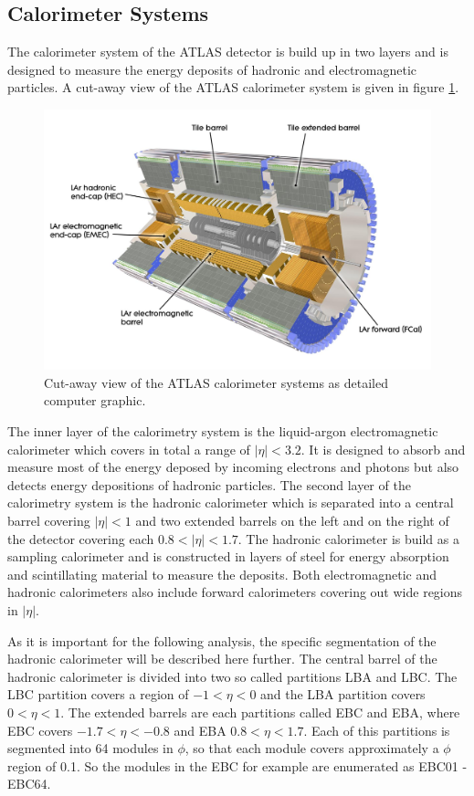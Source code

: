 \subsection{Calorimeter Systems}
The calorimeter system of the ATLAS detector is build up in two layers and is designed to measure the energy deposits of hadronic and electromagnetic particles.
A cut-away view of the ATLAS calorimeter system is given in figure \ref{Calo}.
\begin{figure}[H]
	\centering
	\includegraphics[width=\textwidth]{./Plots/atlas-calo-high.jpg}
	\caption{Cut-away view of the ATLAS calorimeter systems as detailed computer graphic.\cite{Aad:2008zzm}}
	\label{Calo}
\end{figure}
The inner layer of the calorimetry system is the liquid-argon electromagnetic calorimeter which covers in total a range of $|\eta| < 3.2$.
It is designed to absorb and measure most of the energy deposed by incoming electrons and photons but also detects energy depositions of hadronic particles.
The second layer of the calorimetry system is the hadronic calorimeter which is separated into a central barrel covering $|\eta| < 1$ and two extended barrels on the left and on the right of the detector covering each $0.8 < |\eta| < 1.7$.
The hadronic calorimeter is build as a sampling calorimeter and is constructed in layers of steel for energy absorption and scintillating material to measure the deposits.
Both electromagnetic and hadronic calorimeters also include forward calorimeters covering out wide regions in $|\eta|$.

As it is important for the following analysis, the specific segmentation of the hadronic calorimeter will be described here further.
The central barrel of the hadronic calorimeter is divided into two so called partitions LBA and LBC.
The LBC partition covers a region of $-1 < \eta < 0$ and the LBA partition covers $0 < \eta < 1$.
The extended barrels are each partitions called EBC and EBA, where EBC covers $-1.7 < \eta < -0.8$ and EBA $0.8 < \eta < 1.7$.
Each of this partitions is segmented into 64 modules in $\phi$, so that each module covers approximately a $\phi$ region of 0.1.
So the modules in the EBC for example are enumerated as EBC01 - EBC64.
